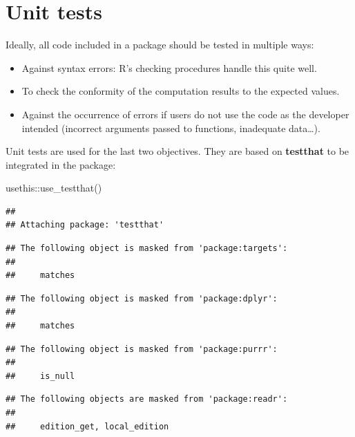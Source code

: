 \documentclass[
  12pt,
  american,
  a4paper,
  extrafontsizes,onecolumn,openright
  ]{memoir}
\newenvironment{Shaded}{\begin{snugshade}}{\end{snugshade}}
\newcommand{\FunctionTok}[1]{\textcolor[rgb]{0.00,0.00,0.00}{#1}}
\newcommand{\NormalTok}[1]{#1}
\newcommand{\SpecialCharTok}[1]{\textcolor[rgb]{0.00,0.00,0.00}{#1}}
\providecommand{\tightlist}{%
  \setlength{\itemsep}{0pt}\setlength{\parskip}{0pt}}
\begin{document}
\hypertarget{unit-tests}{%
\section{Unit tests}\label{unit-tests}}

Ideally, all code included in a package should be tested in multiple ways:

\begin{itemize}
\tightlist
\item
  Against syntax errors: R's checking procedures handle this quite well.
\item
  To check the conformity of the computation results to the expected values.
\item
  Against the occurrence of errors if users do not use the code as the developer intended (incorrect arguments passed to functions, inadequate data\ldots).
\end{itemize}

Unit tests are used for the last two objectives.
They are based on \textbf{testthat} to be integrated in the package:

\scriptsize

\begin{Shaded}
\begin{Highlighting}[]
\NormalTok{usethis}\SpecialCharTok{::}\FunctionTok{use\_testthat}\NormalTok{()}
\end{Highlighting}
\end{Shaded}

\normalsize

\scriptsize

\begin{verbatim}
## 
## Attaching package: 'testthat'
\end{verbatim}

\begin{verbatim}
## The following object is masked from 'package:targets':
## 
##     matches
\end{verbatim}

\begin{verbatim}
## The following object is masked from 'package:dplyr':
## 
##     matches
\end{verbatim}

\begin{verbatim}
## The following object is masked from 'package:purrr':
## 
##     is_null
\end{verbatim}

\begin{verbatim}
## The following objects are masked from 'package:readr':
## 
##     edition_get, local_edition
\end{verbatim}
\end{document}
